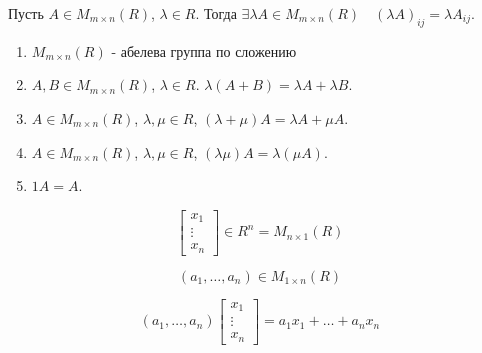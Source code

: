 \begin{definition} \thmslashn 

    Пусть $A\in M_{m \times n}(R)$, $\lambda\in R$. Тогда $\exists{\lambda A\in M_{m \times n}(R)}\quad (\lambda A)_{ij} = \lambda A_{ij}$.
\end{definition}
\begin{properties} \thmslashn

    \begin{enumerate}
        \item $M_{m \times n}(R)$ - абелева группа по сложению
        \item $A, B\in M_{m \times n}(R)$, $\lambda\in R$. $\lambda (A + B) = \lambda A + \lambda B$.
        \item $A\in M_{m \times n}(R)$, $\lambda, \mu\in R$, $(\lambda + \mu)A = \lambda A + \mu A$.
        \item  $A\in M_{m \times n}(R)$, $\lambda, \mu\in R$, $(\lambda\mu)A = \lambda(\mu A)$.
        \item  $1A = A$.
    \end{enumerate}
\end{properties}
\begin{remark} \thmslashn

    \begin{equation*}
        \begin{bmatrix} x_1\\ \vdots\\ x_{n} \end{bmatrix}\in R^{n} = M_{n \times 1}(R) 
    \end{equation*}

    \begin{equation*}
        \left( a_1, \ldots, a_{n} \right)\in M_{1 \times n}(R) 
    \end{equation*}

\end{remark}
\begin{definition} \thmslashn 

\begin{equation*}
    \left( a_1, \ldots, a_{n} \right) \begin{bmatrix} x_1\\ \vdots\\ x_{n} \end{bmatrix} = a_1x_1 + \ldots + a_{n}x_n  
\end{equation*}
\end{definition}
